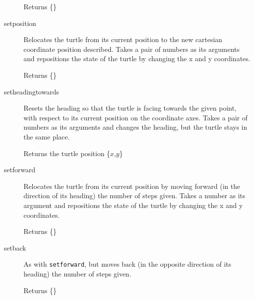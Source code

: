 \begin{description}
       Returns \{\}


     \item[setposition]
       Relocates the turtle from its current position to the
       new cartesian coordinate position described. Takes a pair of
       numbers as its arguments and repositions the state of the turtle by
       changing the x and y coordinates.

       Returns \{\}


     \item[setheadingtowards]
       Resets the heading so that the turtle is facing
       towards the given point, with respect to its current position on
       the coordinate axes. Takes a pair of numbers as its arguments and
       changes the heading, but the turtle stays in the same place.

       Returns the turtle position \{$x$,$y$\}


     \item[setforward]
       Relocates the turtle from its current position by
       moving forward (in the direction of its heading) the number of
       steps given. Takes a number as its argument and repositions the
       state of the turtle by changing the x and y coordinates.

       Returns \{\}


     \item[setback]
       As with \texttt{setforward}, but moves back (in the opposite
       direction of its heading) the number of steps given.

       Returns \{\}


\end{description}

